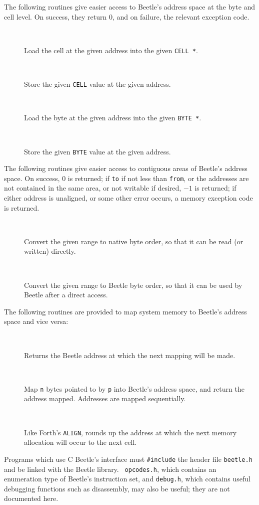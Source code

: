 \documentclass[english]{article}
\newlength{\ifacewidth}\ifacewidth=\textwidth \advance\ifacewidth by -0.1in
\newlength{\innerwidth}\innerwidth=\ifacewidth \advance\innerwidth by -0.5in
\newcommand{\ifacec}[2]{\item[]\parbox{\ifacewidth}{\hspace*{2.5mm}{\tt #1}\\[0.5ex]\hspace*{0.4in}\parbox{\innerwidth}{#2}}}
\begin{document}
The following routines give easier access to Beetle’s address space at the byte and cell level. On success, they return $0$, and on failure, the relevant exception code.

\begin{description}
\ifacec{int beetle\_load\_cell(UCELL address, CELL *value)}{Load the cell at the given address into the given {\tt CELL *}.}
\ifacec{int beetle\_store\_cell(UCELL address, CELL value)}{Store the given {\tt CELL} value at the given address.}
\ifacec{int beetle\_load\_byte(UCELL address, BYTE *value)}{Load the byte at the given address into the given {\tt BYTE *}.}
\ifacec{int beetle\_store\_byte(UCELL address, BYTE value)}{Store the given {\tt BYTE} value at the given address.}
\end{description}

The following routines give easier access to contiguous areas of Beetle’s address space. On success, $0$ is returned; if {\tt to} if not less than {\tt from}, or the addresses are not contained in the same area, or not writable if desired, $-1$ is returned; if either address is unaligned, or some other error occurs, a memory exception code is returned.

\begin{description}
\ifacec{int beetle\_pre\_dma(UCELL from, UCELL to, bool write)}{Convert the given range to native byte order, so that it can be read (or written) directly.}
\ifacec{int beetle\_post\_dma(UCELL from, UCELL to)}{Convert the given range to Beetle byte order, so that it can be used by Beetle after a direct access.}
\end{description}

The following routines are provided to map system memory to Beetle’s address space and vice versa:

\begin{description}
\ifacec{UCELL mem\_here()}{Returns the Beetle address at which the next mapping will be made.}
\ifacec{UCELL mem\_allot(void *p, size\_t n)}{Map {\tt n} bytes pointed to by {\tt p} into Beetle’s address space, and return the address mapped. Addresses are mapped sequentially.}
\ifacec{UCELL mem\_align(void)}{Like Forth’s {\tt ALIGN}, rounds up the address at which the next memory allocation will occur to the next cell.}
\end{description}

Programs which use C Beetle's interface must {\tt \#include} the header file
{\tt beetle.h} and be linked with the Beetle library. {\tt
opcodes.h}, which contains an enumeration type of Beetle's instruction set,
and {\tt debug.h}, which contains useful debugging functions such as
disassembly, may also be useful; they are not documented here.
\end{document}

